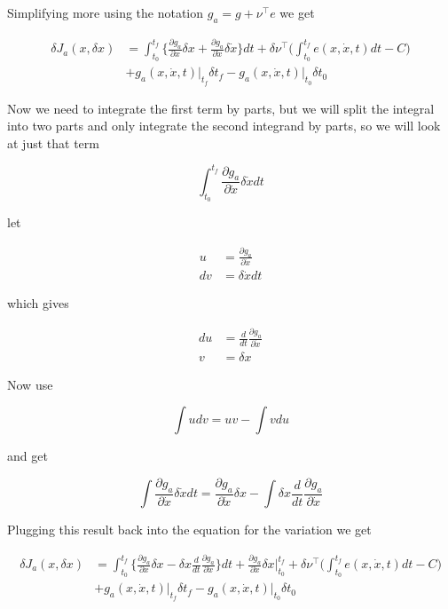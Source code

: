 \documentclass[11pt,letterpaper,onecolumn,notitlepage]{article}
\begin{document}
  Simplifying more using the notation $g_{a}=g+\nu^{\top}e$ we get

  \begin{align*}
    \delta J_{a}(x,\delta x)&=
    \int_{t_{0}}^{t_{f}}\biggr\{\frac{\partial{}g_{a}}{\partial{}x}\delta x+\frac{\partial{}g_{a}}{\partial\dot{x}}\delta\dot{x}\biggr\}dt
    +\delta\nu^{\top}\biggr(\int_{t_{0}}^{t_{f}}e(x,\dot{x},t)dt-C\biggr) \\
    &+g_{a}(x,\dot{x},t)\biggr|_{t_{f}}\delta t_{f}
    -g_{a}(x,\dot{x},t)\biggr|_{t_{0}}\delta t_{0}
  \end{align*}

  Now we need to integrate the first term by parts, but we will split the integral into two parts and only integrate the second integrand by parts, so we will look at just that term

  \begin{equation*}
    \int_{t_{0}}^{t_{f}}\frac{\partial{}g_{a}}{\partial\dot{x}}\delta\dot{x}dt
  \end{equation*}

  let

  \begin{align*}
    u&=\frac{\partial{}g_{a}}{\partial\dot{x}} \\
    dv&=\delta\dot{x}dt
  \end{align*}

  which gives

  \begin{align*}
    du&=\frac{d}{dt}\frac{\partial{}g_{a}}{\partial\dot{x}} \\
    v&=\delta x
  \end{align*}

  Now use

  \begin{equation*}
    \int udv=uv-\int vdu
  \end{equation*}

  and get

  \begin{equation*}
    \int \frac{\partial{}g_{a}}{\partial\dot{x}}\delta\dot{x}dt
    =
    \frac{\partial{}g_{a}}{\partial\dot{x}}\delta x
    -\int\delta x\frac{d}{dt}\frac{\partial{}g_{a}}{\partial\dot{x}}
  \end{equation*}

  Plugging this result back into the equation for the variation we get

  \begin{align*}
    \delta J_{a}(x,\delta x)&=
    \int_{t_{0}}^{t_{f}}\biggr\{\frac{\partial{}g_{a}}{\partial{}x}\delta x-\delta x\frac{d}{dt}\frac{\partial{}g_{a}}{\partial\dot{x}}\biggr\}dt
    +\frac{\partial{}g_{a}}{\partial\dot{x}}\delta x\biggr|_{t_{0}}^{t_{f}}
    +\delta\nu^{\top}\biggr(\int_{t_{0}}^{t_{f}}e(x,\dot{x},t)dt-C\biggr) \\
    &+g_{a}(x,\dot{x},t)\biggr|_{t_{f}}\delta t_{f}
    -g_{a}(x,\dot{x},t)\biggr|_{t_{0}}\delta t_{0}
  \end{align*}
\end{document}
